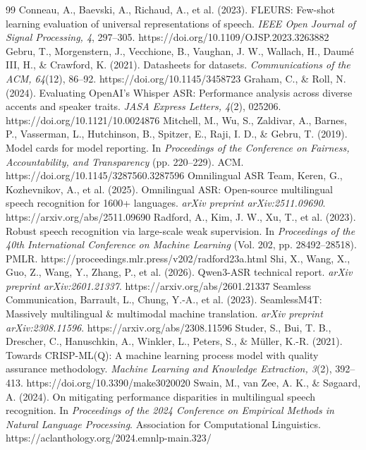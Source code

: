 \documentclass[11pt,letterpaper]{article}
\begin{document}
\begin{thebibliography}{99}
 Conneau, A., Baevski, A., Richaud, A., et al. (2023). FLEURS: Few-shot learning evaluation of universal representations of speech. \textit{IEEE Open Journal of Signal Processing, 4}, 297--305. https://doi.org/10.1109/OJSP.2023.3263882
 Gebru, T., Morgenstern, J., Vecchione, B., Vaughan, J. W., Wallach, H., Daumé III, H., \& Crawford, K. (2021). Datasheets for datasets. \textit{Communications of the ACM, 64}(12), 86--92. https://doi.org/10.1145/3458723
 Graham, C., \& Roll, N. (2024). Evaluating OpenAI's Whisper ASR: Performance analysis across diverse accents and speaker traits. \textit{JASA Express Letters, 4}(2), 025206. https://doi.org/10.1121/10.0024876
 Mitchell, M., Wu, S., Zaldivar, A., Barnes, P., Vasserman, L., Hutchinson, B., Spitzer, E., Raji, I. D., \& Gebru, T. (2019). Model cards for model reporting. In \textit{Proceedings of the Conference on Fairness, Accountability, and Transparency} (pp. 220--229). ACM. https://doi.org/10.1145/3287560.3287596
 Omnilingual ASR Team, Keren, G., Kozhevnikov, A., et al. (2025). Omnilingual ASR: Open-source multilingual speech recognition for 1600+ languages. \textit{arXiv preprint arXiv:2511.09690}. https://arxiv.org/abs/2511.09690
 Radford, A., Kim, J. W., Xu, T., et al. (2023). Robust speech recognition via large-scale weak supervision. In \textit{Proceedings of the 40th International Conference on Machine Learning} (Vol. 202, pp. 28492--28518). PMLR. https://proceedings.mlr.press/v202/radford23a.html
 Shi, X., Wang, X., Guo, Z., Wang, Y., Zhang, P., et al. (2026). Qwen3-ASR technical report. \textit{arXiv preprint arXiv:2601.21337}. https://arxiv.org/abs/2601.21337
 Seamless Communication, Barrault, L., Chung, Y.-A., et al. (2023). SeamlessM4T: Massively multilingual \& multimodal machine translation. \textit{arXiv preprint arXiv:2308.11596}. https://arxiv.org/abs/2308.11596
 Studer, S., Bui, T. B., Drescher, C., Hanuschkin, A., Winkler, L., Peters, S., \& Müller, K.-R. (2021). Towards CRISP-ML(Q): A machine learning process model with quality assurance methodology. \textit{Machine Learning and Knowledge Extraction, 3}(2), 392--413. https://doi.org/10.3390/make3020020
 Swain, M., van Zee, A. K., \& Søgaard, A. (2024). On mitigating performance disparities in multilingual speech recognition. In \textit{Proceedings of the 2024 Conference on Empirical Methods in Natural Language Processing}. Association for Computational Linguistics. https://aclanthology.org/2024.emnlp-main.323/

\end{thebibliography}
\end{document}
